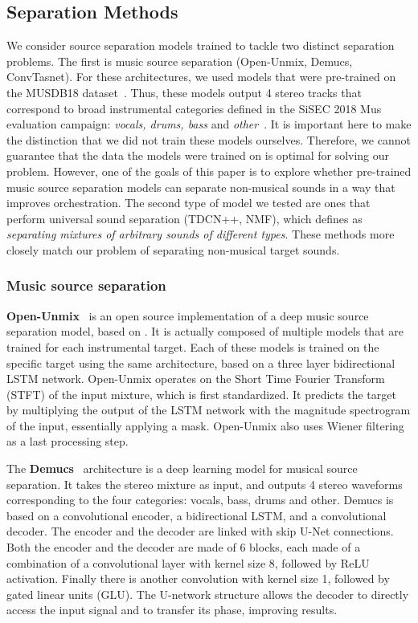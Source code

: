 \documentclass{article}
\begin{document}
		\subsection{Separation Methods}
	We consider source separation models trained to tackle two distinct separation problems. The first is music source separation (Open-Unmix, Demucs, ConvTasnet). For these architectures, we used models that were pre-trained on the MUSDB18 dataset~\cite{MUSDB18}. Thus, these models output 4 stereo tracks that correspond to broad instrumental categories defined in the SiSEC 2018 Mus evaluation campaign: \textit{vocals, drums, bass} and \textit{other}~\cite{Stoter_SiSEC}. It is important here to make the distinction that we did not train these models ourselves. Therefore, we cannot guarantee that the data the models were trained on is optimal for solving our problem. However, one of the goals of this paper is to explore whether pre-trained music source separation models can separate non-musical sounds in a way that improves orchestration.
	The second type of model we tested are ones that perform universal sound separation (TDCN++, NMF), which \cite{tdcnpp} defines as \textit{separating mixtures of arbitrary sounds of different types}. These methods more closely match our problem of separating non-musical target sounds.
			
			\subsubsection{Music source separation}
			\textbf{Open-Unmix}~\cite{open-unmix} is an open source implementation of a deep music source separation model, based on \cite{Uhlich2017}. It is actually composed of multiple models that are trained for each instrumental target. Each of these models is trained on the specific target using the same architecture, based on a three layer bidirectional LSTM network. Open-Unmix operates on the Short Time Fourier Transform (STFT) of the input mixture, which is first standardized. It predicts the target by multiplying the output of the LSTM network with the magnitude spectrogram of the input, essentially applying a mask. Open-Unmix also uses Wiener filtering as a last processing step.
			
			The \textbf{Demucs}~\cite{demucs} architecture is a deep learning model for musical source separation. It takes the stereo mixture as input, and outputs 4 stereo waveforms corresponding to the four categories: vocals, bass, drums and other. Demucs is based on a convolutional encoder, a bidirectional LSTM, and a convolutional decoder. The encoder and the decoder are linked with skip U-Net connections. Both the encoder and the decoder are made of 6 blocks, each made of a combination of a convolutional layer with kernel size 8, followed by ReLU activation. Finally there is another convolution with kernel size 1, followed by gated linear units (GLU). The U-network structure allows the decoder to directly access the input signal and to transfer its phase, improving results.	
\end{document}
